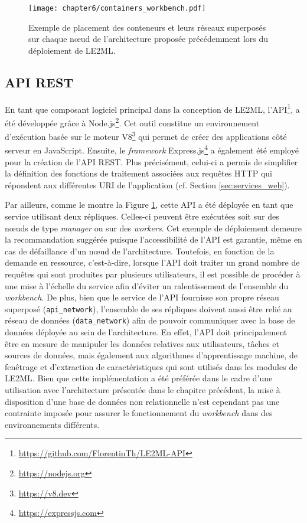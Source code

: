 \begin{figure}[H]
	\centering
	\texttt{[image: chapter6/containers\_workbench.pdf]}
        \caption{Exemple de placement des conteneurs et leurs réseaux superposés sur chaque n\oe{}ud de l'architecture proposée précédemment lors du déploiement de \acs{LE2ML}.}
	\label{fig:containers_workbench}
\end{figure}

\subsection{\acs{API} \acs{REST}}

En tant que composant logiciel principal dans la conception de \acs{LE2ML}, l'\acs{API}\footnote{\url{https://github.com/FlorentinTh/LE2ML-API}}, a été développée grâce à Node.js\footnote{\url{https://nodejs.org}}. Cet outil constitue un environnement d'exécution basée sur le moteur V8\footnote{\url{https://v8.dev}} qui permet de créer des applications côté serveur en JavaScript. Ensuite, le \textit{framework} Express.js\footnote{\url{https://expressjs.com}} a également été employé pour la création de l'\acs{API} \acs{REST}. Plus précisément, celui-ci a permis de simplifier la définition des fonctions de traitement associées aux requêtes \acs{HTTP} qui répondent aux différentes \acs{URI} de l'application (cf. Section \ref{sec:services_web}).

Par ailleurs, comme le montre la Figure \ref{fig:containers_workbench}, cette \acs{API} a été déployée en tant que service utilisant deux répliques. Celles-ci peuvent être exécutées soit sur des n\oe{}uds de type \textit{manager} ou sur des \textit{workers}. Cet exemple de déploiement demeure la recommandation suggérée puisque l'accessibilité de l'\acs{API} est garantie, même en cas de défaillance d'un n\oe{}ud de l'architecture. Toutefois, en fonction de la demande en ressource, c'est-à-dire, lorsque l'\acs{API} doit traiter un grand nombre de requêtes qui sont produites par plusieurs utilisateurs, il est possible de procéder à une mise à l'échelle du service afin d'éviter un ralentissement de l'ensemble du \textit{workbench}. De plus, bien que le service de l'\acs{API} fournisse son propre réseau superposé (\texttt{api\_network}), l'ensemble de ses répliques doivent aussi être relié au réseau de données (\texttt{data\_network}) afin de pouvoir communiquer avec la base de données déployée au sein de l'architecture. En effet, l'\acs{API} doit principalement être en mesure de manipuler les données relatives aux utilisateurs, tâches et sources de données, mais également aux algorithmes d'apprentissage machine, de fenêtrage et d'extraction de caractéristiques qui sont utilisés dans les modules de \acs{LE2ML}. Bien que cette implémentation a été préférée dans le cadre d'une utilisation avec l'architecture présentée dans le chapitre précédent, la mise à disposition d'une base de données non relationnelle n'est cependant pas une contrainte imposée pour assurer le fonctionnement du \textit{workbench} dans des environnements différents.

